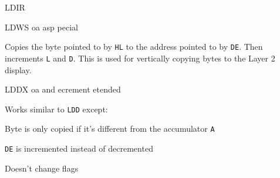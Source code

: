 \documentclass[12pt,twoside,openright,a4paper]{book}
\begin{document}
\begin{basedescript}{
	\desclabelstyle{\multilinelabel}
	\desclabelwidth{3cm}}
\begin{DetailItem}{LDIR}
	\end{DetailItem}


	\label{DetailRefLDWS}
	\begin{DetailItem}{LDWS\ZXN}
		{oa asp pecial}
		{\SymLDWS}

		Copies the byte pointed to by {\tt HL} to the address pointed to by {\tt DE}. Then increments {\tt L} and {\tt D}. This is used for vertically copying bytes to the Layer 2 display.
			
		\begin{DetailEffects}[v]
			\FlagsLDWS
		\end{DetailEffects}
				
		\begin{DetailTiming}
		\end{DetailTiming}



	\end{DetailItem}

	\label{DetailRefLDDX}
	\begin{DetailItem}{LDDX\ZXN}
		{oa\IH{D} and ecrement etended}		
		{\SymLDDX}

		Works similar to {\tt LDD} except:
		\begin{DetailCompactList}
			\item Byte is only copied if it's different from the accumulator {\tt A}
			\item {\tt DE} is incremented instead of decremented
			\item Doesn't change flags
		\end{DetailCompactList}

		\begin{DetailEffects}
			\FlagsLDDX
		\end{DetailEffects}
				

\end{DetailItem}
\end{basedescript}
\end{document}
